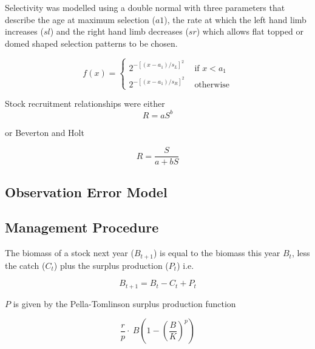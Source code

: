 \documentclass[%
nonumbib,      %
%
]{nrc1}                          %
\begin{document}
Selectivity was modelled using a double normal \citep[see][]{hilborn2000documentation} with three parameters that describe the age at maximum selection ($a1$), the rate at which the left hand limb increases ($sl$) and the right hand limb decreases ($sr$) which allows flat topped or domed shaped selection patterns to be chosen.

\begin{equation}
f(x) = \left\{ \begin{array}{rl}
 2^{-[(x-a_1)/s_L]^2} &\mbox{ if $x<a_1$} \\
 2^{-[(x-a_1)/s_R]^2} &\mbox{ otherwise}
       \end{array} \right.
\end{equation}

Stock recruitment relationships were either \citep{cushing1973dependence}
\begin{equation} R=aS^b \end{equation}

or Beverton and Holt \citep{beverton_dynamics_1993}

\begin{equation} R=\frac{S}{a+bS} \end{equation}

\subsection*{Observation Error Model}


\subsection*{Management Procedure}

The biomass of a stock next year ($B_{t+1}$) is equal to the biomass this year $B_{t}$, less the catch ($C_t$) plus the surplus production ($P_t$) i.e. 

\begin{equation}  B_{t+1}=B_{t}-C_{t}+P_{t}\end{equation}  

$P$ is given by the Pella-Tomlinson surplus production function \citep{pella1969generalized}

\begin{equation}\frac{r}{p}\cdot~B(1-(\frac{B}{K})^p)\end{equation}  
\end{document}

